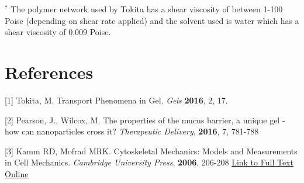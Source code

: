 \documentclass[11pt,a4paper]{article}
\begin{document}
\begin{flushleft}
\begin{justify}
\medskip 
$^*$  The polymer network used by Tokita has a shear viscosity of between 1-100 Poise (depending on shear rate applied) and the solvent used is water which has a shear viscosity of 0.009 Poise.

\end{justify}

\section{References}

[1] Tokita, M. Transport Phenomena in Gel. \textit{Gels} \textbf{2016}, 2, 17. 
\bigskip

[2] Pearson, J., Wilcox, M. The properties of the mucus barrier, a unique gel - how can nanoparticles cross it? \textit{Therapeutic Delivery}, \textbf{2016}, 7, 781-788 

\bigskip

[3] Kamm RD, Mofrad MRK. Cytoskeletal Mechanics: Models and Measurements in Cell Mechanics. \textit{Cambridge University Press}, \textbf{2006}, 206-208 \href{http://search.ebscohost.com.portal.lib.fit.edu/login.aspx?direct=true&db=e000xna&AN=174455&site=ehost-live}{Link to Full Text Online}

\begin{comment}

This will produce \textsc{small caps} text.\\

This will produce \textbf{bold and big} text.\\

This will produce \begin{huge} really huge \end{huge} text.\\

This will generate \begin{tiny} quite small \end{tiny} print.\\

\begin{figure}[h]
\centering
\texttt{[image: strang\_0556.jpg]}
\caption{Strang Splitting at time  = 0.56 seconds}
\end{figure}

$$
ax^2 + bx + c
$$

$ax^2 + bx + c$ is a typical 2nd degree equation. It can be solved using the quadratic formula given below:\\


\end{comment}
\end{flushleft}
\end{document}
